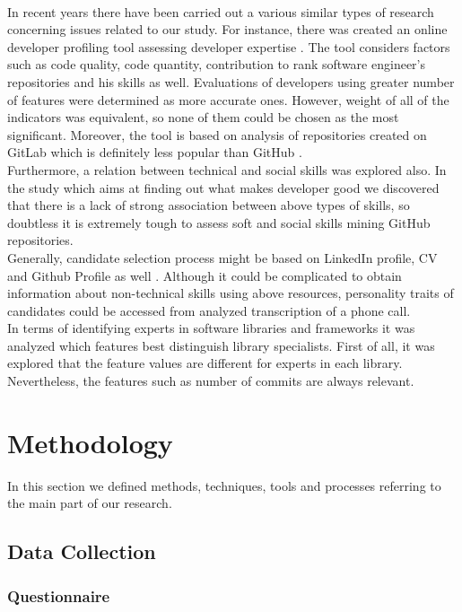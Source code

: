 \documentclass[graybox]{svmult}
\begin{document}
\\In recent years there have been carried out a various similar types of research concerning issues related to our study. For instance, there was created an online developer profiling tool assessing developer expertise \cite{GitLabProfilingTool}. The tool considers factors such as code quality, code quantity, contribution to rank  software engineer’s repositories and his skills as well. Evaluations of developers using greater number of features were determined as more accurate ones. However, weight of all of the indicators was equivalent, so none of them could be chosen as the most significant. Moreover, the tool is based on analysis of repositories created on GitLab which is definitely less popular than GitHub \cite{GitLabvsGithub}.
\\Furthermore, a relation between technical and social skills \cite{WhatMakesGoodDev} was explored also. In the study which aims at finding out what makes developer good we discovered that there is a lack of strong association between above types of skills, so doubtless it is extremely tough to assess soft and social skills mining GitHub repositories.
\\Generally, candidate selection process might be based on LinkedIn profile, CV and Github Profile as well \cite{CandidateSelection}. Although it could be complicated to obtain information about non-technical skills using above resources, personality traits of candidates could be accessed from analyzed transcription of a phone call.
\\In terms of identifying experts in software libraries and frameworks \cite{SoftwareLibraries} it was analyzed which features best distinguish library specialists. First of all, it was explored that the feature values are different for experts in each library. Nevertheless, the features such as number of commits are always relevant.


\section{Methodology}
In this section we defined methods, techniques, tools and processes referring to the main part of our research.
\subsection{Data Collection}

\subsubsection{Questionnaire}
\end{document}
